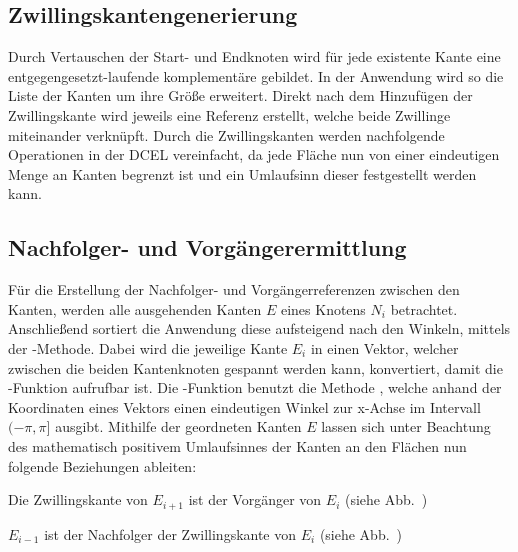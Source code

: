 \subsection{Zwillingskantengenerierung}
Durch Vertauschen der Start- und Endknoten wird für jede existente Kante eine entgegengesetzt-laufende komplementäre  gebildet.
In der Anwendung wird so die Liste der Kanten um ihre Größe erweitert.
Direkt nach dem Hinzufügen der Zwillingskante wird jeweils eine Referenz erstellt, welche beide Zwillinge miteinander verknüpft.
Durch die Zwillingskanten werden nachfolgende Operationen in der DCEL vereinfacht, da jede Fläche nun von einer eindeutigen Menge an Kanten begrenzt ist und ein Umlaufsinn dieser festgestellt werden kann.

\subsection{Nachfolger- und Vorgängerermittlung}
Für die Erstellung der Nachfolger- und Vorgängerreferenzen zwischen den Kanten, werden alle ausgehenden Kanten $E$ eines Knotens $N_i$ betrachtet.
Anschließend sortiert die Anwendung diese aufsteigend nach den Winkeln, mittels der -Methode.
Dabei wird die jeweilige Kante $E_i$ in einen Vektor, welcher zwischen die beiden Kantenknoten gespannt werden kann, konvertiert, damit die -Funktion aufrufbar ist.
Die -Funktion benutzt die Methode , welche anhand der Koordinaten eines Vektors einen eindeutigen Winkel zur x-Achse im Intervall $(-\pi,\pi]$ ausgibt.
Mithilfe der geordneten Kanten $E$ lassen sich unter Beachtung des mathematisch positivem Umlaufsinnes der Kanten an den Flächen nun folgende Beziehungen ableiten:

\begin{compactenum}
	\item Die Zwillingskante von $E_{i+1}$ ist der Vorgänger von $E_i$ (siehe Abb.~\thebildnrnext)
	\item $E_{i-1}$ ist der Nachfolger der Zwillingskante von $E_i$ (siehe Abb.~\thebildnrnext)
\end{compactenum}

